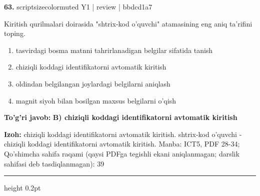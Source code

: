 \documentclass[10pt,a4paper]{article}
\begin{document}
{\bfseries\sffamily\color{ink} 63.} {scriptsizecolor{muted} Y1 | review | bbdcd1a7}
\par
Kiritish qurilmalari doirasida "shtrix-kod o'quvchi" atamasining eng aniq ta'rifini toping.
\begin{enumerate}[label=\Alph*),leftmargin=9mm]
\item tasvirdagi bosma matnni tahrirlanadigan belgilar sifatida tanish
\item chiziqli koddagi identifikatorni avtomatik kiritish
\item oldindan belgilangan joylardagi belgilarni aniqlash
\item magnit siyoh bilan bosilgan maxsus belgilarni o'qish
\end{enumerate}
\begin{tcolorbox}[enhanced,breakable,colback=teal!4,colframe=teal!60!black,boxrule=0.45pt,arc=1.2mm,left=2.7mm,right=2.7mm,top=1.8mm,bottom=1.8mm,before skip=2mm,after skip=2mm]
{\bfseries\sffamily\color{teal}To'g'ri javob:} \textbf{B) chiziqli koddagi identifikatorni avtomatik kiritish}
\par\smallskip
{\bfseries Izoh:} chiziqli koddagi identifikatorni avtomatik kiritish. shtrix-kod o'quvchi - chiziqli koddagi identifikatorni avtomatik kiritish. Manba: ICT5, PDF 28-34; Qo'shimcha sahifa raqami (qaysi PDFga tegishli ekani aniqlanmagan; darslik sahifasi deb tasdiqlanmagan): 39
\end{tcolorbox}
\vspace{2mm}\hrule height 0.2pt\vspace{3mm}
\end{document}
